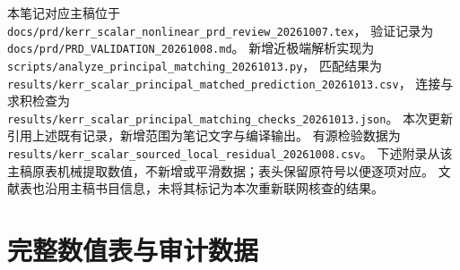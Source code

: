 \documentclass[UTF8,fontset=fandol,11pt,a4paper]{ctexart}
\numberwithin{equation}{section}
\begin{document}
本笔记对应主稿位于 \nolinkurl{docs/prd/kerr_scalar_nonlinear_prd_review_20261007.tex}，
验证记录为 \nolinkurl{docs/prd/PRD_VALIDATION_20261008.md}。
新增近极端解析实现为 \nolinkurl{scripts/analyze_principal_matching_20261013.py}，
匹配结果为 \nolinkurl{results/kerr_scalar_principal_matched_prediction_20261013.csv}，
连接与求积检查为 \nolinkurl{results/kerr_scalar_principal_matching_checks_20261013.json}。
本次更新引用上述既有记录，新增范围为笔记文字与编译输出。
有源检验数据为 \nolinkurl{results/kerr_scalar_sourced_local_residual_20261008.csv}。
下述附录从该主稿原表机械提取数值，不新增或平滑数据；表头保留原符号以便逐项对应。
文献表也沿用主稿书目信息，未将其标记为本次重新联网核查的结果。
\clearpage\appendix
\section{完整数值表与审计数据}

\clearpage

\end{document}
